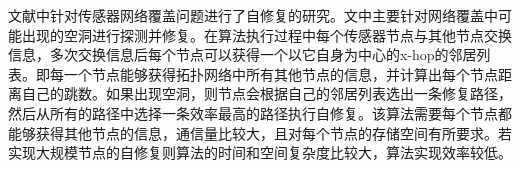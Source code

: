 \begin{figure*}[!htbp]
	\begin{multicols}{2}
		
		\begin{center}
		\end{center}
		\begin{center}
		\end{center}
		\begin{center}
		\end{center}
	\end{multicols}
\end{figure*}

文献\parencite{Auto-holeDetection}中针对传感器网络覆盖问题进行了自修复的研究。文中主要针对网络覆盖中可能出现的空洞进行探测并修复。在算法执行过程中每个传感器节点与其他节点交换信息，多次交换信息后每个节点可以获得一个以它自身为中心的x-hop的邻居列表。即每一个节点能够获得拓扑网络中所有其他节点的信息，并计算出每个节点距离自己的跳数。如果出现空洞，则节点会根据自己的邻居列表选出一条修复路径，然后从所有的路径中选择一条效率最高的路径执行自修复。该算法需要每个节点都能够获得其他节点的信息，通信量比较大，且对每个节点的存储空间有所要求。若实现大规模节点的自修复则算法的时间和空间复杂度比较大，算法实现效率较低。

